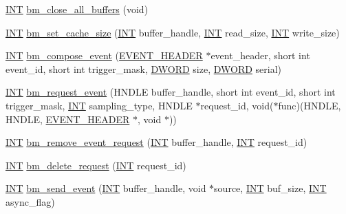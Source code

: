 \begin{DoxyCompactItemize}
\item 
\hyperlink{vppg_8h_a392e62da233ed3e2f7c3fd4f487a3896}{INT} \hyperlink{group__bmfunctionc_ga3a2dae045156606fc157e01a82983a25}{bm\_\-close\_\-all\_\-buffers} (void)
\item 
\hyperlink{vppg_8h_a392e62da233ed3e2f7c3fd4f487a3896}{INT} \hyperlink{group__bmfunctionc_ga2689ca85c6d0023f1a02e6827a5eff6e}{bm\_\-set\_\-cache\_\-size} (\hyperlink{vppg_8h_a392e62da233ed3e2f7c3fd4f487a3896}{INT} buffer\_\-handle, \hyperlink{vppg_8h_a392e62da233ed3e2f7c3fd4f487a3896}{INT} read\_\-size, \hyperlink{vppg_8h_a392e62da233ed3e2f7c3fd4f487a3896}{INT} write\_\-size)
\item 
\hyperlink{vppg_8h_a392e62da233ed3e2f7c3fd4f487a3896}{INT} \hyperlink{group__bmfunctionc_gac5e3e469fb6721a502ebd80a35a328f5}{bm\_\-compose\_\-event} (\hyperlink{structEVENT__HEADER}{EVENT\_\-HEADER} $\ast$event\_\-header, short int event\_\-id, short int trigger\_\-mask, \hyperlink{vt2_8h_a798af1e30bc65f319c1a246cecf59e39}{DWORD} size, \hyperlink{vt2_8h_a798af1e30bc65f319c1a246cecf59e39}{DWORD} serial)
\item 
\hyperlink{vppg_8h_a392e62da233ed3e2f7c3fd4f487a3896}{INT} \hyperlink{group__bmfunctionc_gabf663d96482aeede1846487a7ada8184}{bm\_\-request\_\-event} (HNDLE buffer\_\-handle, short int event\_\-id, short int trigger\_\-mask, \hyperlink{vppg_8h_a392e62da233ed3e2f7c3fd4f487a3896}{INT} sampling\_\-type, HNDLE $\ast$request\_\-id, void($\ast$func)(HNDLE, HNDLE, \hyperlink{structEVENT__HEADER}{EVENT\_\-HEADER} $\ast$, void $\ast$))
\item 
\hyperlink{vppg_8h_a392e62da233ed3e2f7c3fd4f487a3896}{INT} \hyperlink{group__bmfunctionc_ga7810d29ac3894a4e299737bc7c7a2cf1}{bm\_\-remove\_\-event\_\-request} (\hyperlink{vppg_8h_a392e62da233ed3e2f7c3fd4f487a3896}{INT} buffer\_\-handle, \hyperlink{vppg_8h_a392e62da233ed3e2f7c3fd4f487a3896}{INT} request\_\-id)
\item 
\hyperlink{vppg_8h_a392e62da233ed3e2f7c3fd4f487a3896}{INT} \hyperlink{group__bmfunctionc_ga33221a55f8c90e411dea5eb34a2ee773}{bm\_\-delete\_\-request} (\hyperlink{vppg_8h_a392e62da233ed3e2f7c3fd4f487a3896}{INT} request\_\-id)
\item 
\hyperlink{vppg_8h_a392e62da233ed3e2f7c3fd4f487a3896}{INT} \hyperlink{group__bmfunctionc_ga499b14a246f8ab8d5a3b6ec77bfa9407}{bm\_\-send\_\-event} (\hyperlink{vppg_8h_a392e62da233ed3e2f7c3fd4f487a3896}{INT} buffer\_\-handle, void $\ast$source, \hyperlink{vppg_8h_a392e62da233ed3e2f7c3fd4f487a3896}{INT} buf\_\-size, \hyperlink{vppg_8h_a392e62da233ed3e2f7c3fd4f487a3896}{INT} async\_\-flag)

\end{DoxyCompactItemize}
